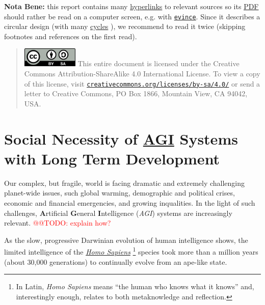 \documentclass[11pt,a4paper,svgnames]{article}
\begin{document}
\begin{titlepage}
  \medskip
  \textbf{Nota Bene:} this report contains many
  \href{https://en.wikipedia.org/wiki/Hyperlink}{hyperlinks} to
  relevant sources so its
  \href{https://en.wikipedia.org/wiki/PDF}{PDF} should rather be read
  on a computer screen, e.g. with
  \href{https://en.wikipedia.org/wiki/Evince}{\texttt{evince}}. Since
  it describes a circular design (with many
  \href{https://en.wikipedia.org/wiki/Cycle_graph}{cycles}
  \cite{Hofstadter:1979:GEB}), we recommend to read it twice (skipping
  footnotes and references on the first read).

  \bigskip


  \begin{quote}
  \begin{relsize}{-1}
\includegraphics[width=75pt]{cc-by-sa} This entire document is
  licensed under the Creative Commons Attribution-ShareAlike 4.0
  International License. To view a copy of this license, visit
  \href{http://creativecommons.org/licenses/by-sa/4.0/}{\texttt{creativecommons.org/licenses/by-sa/4.0/}}
  or send a letter to Creative Commons, PO Box 1866, Mountain View, CA
  94042, USA.
  \end{relsize}
  \end{quote}
  
\end{titlepage}



\tableofcontents

\bigskip


\section{Social Necessity of \href{https://en.wikipedia.org/wiki/Artificial_general_intelligence}{AGI} Systems with  Long Term Development}
\label{sec:social}

Our complex, but fragile, world is facing dramatic and extremely challenging
planet-wide issues, such global warming, demographic and political crises,
economic and financial emergencies, and growing inqualities. In the light of
such challenges, \textbf{A}rtificial \textbf{G}eneral \textbf{I}ntelligence
(\emph{AGI}) systems are increasingly relevant. \textcolor{red}{@@TODO: explain
how?}

As the slow, progressive Darwinian evolution  of human intelligence shows, the
limited intelligence of the 
\emph{\href{https://en.wikipedia.org/wiki/Homo_sapiens}{Homo Sapiens}}
\footnote{In Latin, \emph{Homo Sapiens} means ``the human who knows what it
knows'' and, interestingly enough, relates to both \gls{metaknowledge} and
\gls{reflection}.} species took more than a million years (about 30,000 
generations) to continually evolve from an ape-like state.
\end{document}
